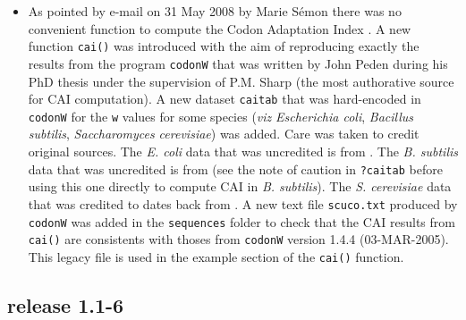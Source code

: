 \documentclass{article}
\begin{document}
\begin{itemize}
\item As pointed by e-mail on 31 May 2008 by Marie S{\'e}mon there was
  no convenient function to compute the Codon Adaptation Index \cite{CAI}.
  A new function \texttt{cai()} was introduced with the aim of reproducing
  exactly the results from the program \texttt{codonW} that was written
  by John Peden during his PhD thesis \cite{codonW} under the supervision 
  of P.M. Sharp (the most authorative source for CAI computation). A new 
  dataset \texttt{caitab} that was hard-encoded in \texttt{codonW} for
  the \texttt{w} values for some species (\textit{viz}
  \textit{Escherichia coli}, \textit{Bacillus subtilis},
  \textit{Saccharomyces cerevisiae}) was added. Care was taken to credit
  original sources. The \textit{E. coli} data that was uncredited is
  from \cite{CAI}. The \textit{B. subtilis} data that was uncredited
  is from \cite{ShieldsDC1987} (see the note of caution in \texttt{?caitab}
  before using this one directly to compute CAI in \textit{B. subtilis}). 
  The \textit{S. cerevisiae} data that was
  credited to \cite{SharpPM1991} dates back from \cite{CAI}. A new
  text file \texttt{scuco.txt} produced by \texttt{codonW} was added
  in the \texttt{sequences} folder to check that the CAI results from
  \texttt{cai()} are consistents with thoses from \texttt{codonW} version
  1.4.4 (03-MAR-2005). This legacy file is used in the example section of
  the \texttt{cai()} function.

\end{itemize}

\subsection*{release 1.1-6}
\end{document}
